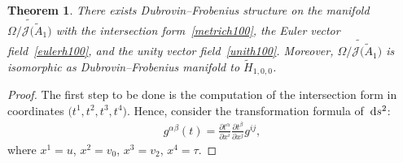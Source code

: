 \documentclass[10pt,a4paper]{amsart}
\numberwithin{equation}{section}
\newtheorem{Theorem}{Theorem}[section]
\newcommand{\Ja}{\mathcal{J}}
\begin{document}
\begin{Theorem}\label{mainresult}
 There exists Dubrovin--Frobenius structure on the manifold $\widetilde{\Omega/\Ja\big(\tilde A_1\big)}$ with the intersection form~\eqref{metrich100}, the Euler vector field~\eqref{eulerh100}, and the unity vector field~\eqref{unith100}. Moreover, $\widetilde{\Omega/\Ja\big(\tilde A_1\big)}$ is isomorphic as Dubrovin--Frobenius manifold to $\widetilde H_{1,0,0}$.
\end{Theorem}



\begin{proof}
The first step to be done is the computation of the intersection form in coordinates $\big(t^1,t^2,t^3,t^4\big)$. Hence, consider the transformation formula of~${\rm d}s^2$:
\begin{gather}\label{metriceta}
g^{\alpha\beta}(t)=\frac{\partial t^\alpha}{\partial x^i}\frac{\partial t^\beta}{\partial x^j}g^{ij},
\end{gather}
where $x^1=u$, $x^2=v_0$, $x^3=v_2$, $x^4=\tau$.


\end{proof}
\end{document}
